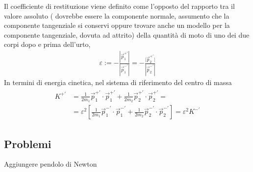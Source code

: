 \documentclass[letterpaper,10pt,italian]{jupyterBook}
\begin{document}
\sphinxAtStartPar
Il coefficiente di restituzione viene definito come l’opposto del rapporto tra il valore assoluto ( dovrebbe essere la componente normale, assumento che la componente tangenziale si conservi \sphinxhyphen{} oppure trovare anche un modello per la componente tangenziale, dovuta ad attrito) della quantità di moto di uno dei due corpi dopo e prima dell’urto,
\begin{equation*}
\begin{split}\varepsilon := - \frac{|{\vec{p}_1^{+ '}}   |}{|{\vec{p}_1^{- '}}  |} = - \frac{{|\vec{p}_2^{+ '}} |}{|{\vec{p}_2^{- '}} |}\end{split}
\end{equation*}
\sphinxAtStartPar
In termini di energia cinetica, nel sistema di riferimento del centro di massa
\begin{equation*}
\begin{split}\begin{aligned}
{K^{+ '}} & = \frac{1}{2 m_1} {\vec{p}_1^{+ '}}  \cdot {\vec{p}_1^{+ '}}  + \frac{1}{2 m_2} {\vec{p}_2^{+ '}}  \cdot {\vec{p}_2^{+ '}}  = \\
       & = \varepsilon^2 \left[ \frac{1}{2 m_1} {\vec{p}_1^{- '}}  \cdot {\vec{p}_1^{- '}}  + \frac{1}{2 m_2} {\vec{p}_2^{- '}}  \cdot {\vec{p}_2^{- '}}  \right] = \varepsilon^2 {K^{- '}} 
\end{aligned}\end{split}
\end{equation*}

\subsection{Problemi}
\label{\detokenize{ch/mechanics/dynamics-collisions:problemi}}
\sphinxAtStartPar
{} Aggiungere pendolo di Newton
\end{document}
